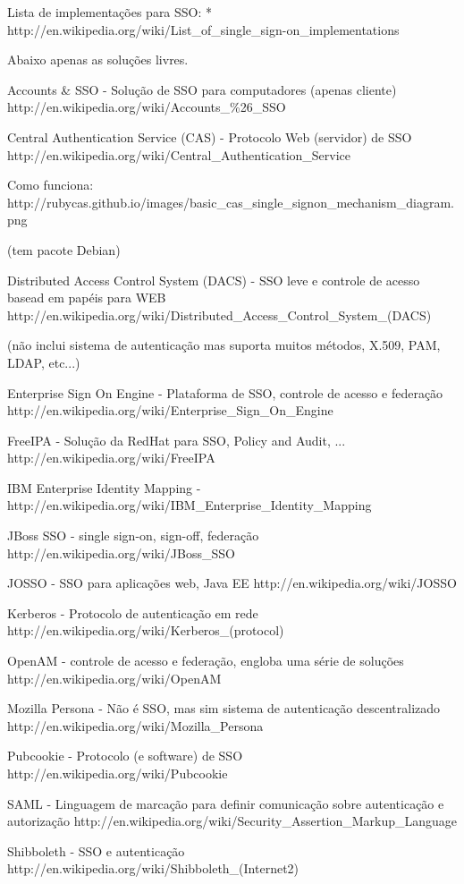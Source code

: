\documentclass[11pt]{article}
\begin{document}
Lista de implementações para SSO:
   * http://en.wikipedia.org/wiki/List\_of\_single\_sign-on\_implementations

Abaixo apenas as soluções livres.

Accounts \& SSO - Solução de SSO para computadores (apenas cliente)
http://en.wikipedia.org/wiki/Accounts\_\%26\_SSO

Central Authentication Service (CAS) - Protocolo Web (servidor) de SSO
http://en.wikipedia.org/wiki/Central\_Authentication\_Service

Como funciona:
http://rubycas.github.io/images/basic\_cas\_single\_signon\_mechanism\_diagram.png

(tem pacote Debian)

Distributed Access Control System (DACS) - SSO leve e controle de acesso basead em papéis para WEB
http://en.wikipedia.org/wiki/Distributed\_Access\_Control\_System\_(DACS)

(não inclui sistema de autenticação mas suporta muitos métodos, X.509, PAM, LDAP, etc...)


Enterprise Sign On Engine - Plataforma de SSO, controle de acesso e federação
http://en.wikipedia.org/wiki/Enterprise\_Sign\_On\_Engine

FreeIPA - Solução da RedHat para SSO, Policy and Audit, ...
http://en.wikipedia.org/wiki/FreeIPA

IBM Enterprise Identity Mapping - 
http://en.wikipedia.org/wiki/IBM\_Enterprise\_Identity\_Mapping

JBoss SSO - single sign-on, sign-off, federação
http://en.wikipedia.org/wiki/JBoss\_SSO

JOSSO - SSO para aplicações web, Java EE
http://en.wikipedia.org/wiki/JOSSO

Kerberos - Protocolo de autenticação em rede
http://en.wikipedia.org/wiki/Kerberos\_(protocol)

OpenAM - controle de acesso e federação, engloba uma série de soluções
http://en.wikipedia.org/wiki/OpenAM

Mozilla Persona - Não é SSO, mas sim sistema de autenticação descentralizado
http://en.wikipedia.org/wiki/Mozilla\_Persona

Pubcookie - Protocolo (e software) de SSO
http://en.wikipedia.org/wiki/Pubcookie

SAML - Linguagem de marcação para definir comunicação sobre autenticação e autorização
http://en.wikipedia.org/wiki/Security\_Assertion\_Markup\_Language

Shibboleth - SSO e autenticação
http://en.wikipedia.org/wiki/Shibboleth\_(Internet2)
\end{document}
